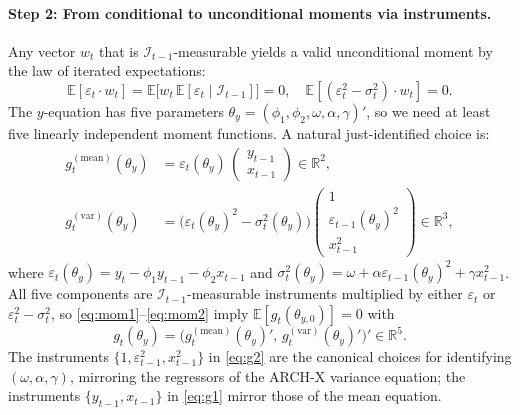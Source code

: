 \documentclass[12pt]{article}
\newcommand{\E}{\mathbb{E}}
\newcommand{\Info}{\mathcal{I}}
\begin{document}
\paragraph{Step 2: From conditional to unconditional moments via instruments.} Any vector $w_t$ that is $\Info_{t-1}$-measurable yields a valid unconditional moment by the law of iterated expectations:
\begin{equation*}
\E[\varepsilon_t\cdot w_t]=\E\!\big[w_t\,\E[\varepsilon_t\mid\Info_{t-1}]\big]=0,\quad
\E[(\varepsilon_t^2-\sigma_t^2)\cdot w_t]=0.
\end{equation*}
The $y$-equation has five parameters $\theta_y=(\phi_1,\phi_2,\omega,\alpha,\gamma)'$, so we need at least five linearly independent moment functions. A natural just-identified choice is:
\begin{align}
g_t^{(\text{mean})}(\theta_y) &= \varepsilon_t(\theta_y)\,\begin{pmatrix} y_{t-1}\\ x_{t-1}\end{pmatrix}\in\mathbb{R}^{2},\label{eq:g1}\\
g_t^{(\text{var})}(\theta_y) &= \big(\varepsilon_t(\theta_y)^2-\sigma_t^2(\theta_y)\big)\begin{pmatrix} 1\\ \varepsilon_{t-1}(\theta_y)^2\\ x_{t-1}^2\end{pmatrix}\in\mathbb{R}^{3},\label{eq:g2}
\end{align}
where $\varepsilon_t(\theta_y)=y_t-\phi_1 y_{t-1}-\phi_2 x_{t-1}$ and $\sigma_t^2(\theta_y)=\omega+\alpha\varepsilon_{t-1}(\theta_y)^2+\gamma x_{t-1}^2$. All five components are $\Info_{t-1}$-measurable instruments multiplied by either $\varepsilon_t$ or $\varepsilon_t^2-\sigma_t^2$, so \eqref{eq:mom1}--\eqref{eq:mom2} imply $\E[g_t(\theta_{y,0})]=0$ with
\begin{equation*}
g_t(\theta_y) = \big(g_t^{(\text{mean})}(\theta_y)',\,g_t^{(\text{var})}(\theta_y)'\big)' \in \mathbb{R}^{5}.
\end{equation*}
The instruments $\{1,\varepsilon_{t-1}^2,x_{t-1}^2\}$ in \eqref{eq:g2} are the canonical choices for identifying $(\omega,\alpha,\gamma)$, mirroring the regressors of the ARCH-X variance equation; the instruments $\{y_{t-1},x_{t-1}\}$ in \eqref{eq:g1} mirror those of the mean equation.
\end{document}
